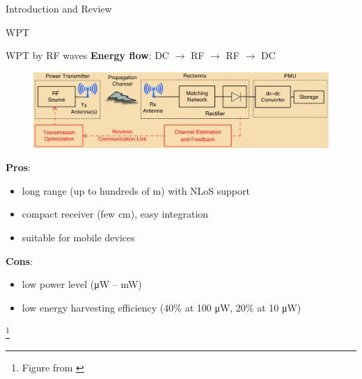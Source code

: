 \documentclass[9pt]{beamer}
\newcommand\blfootnote[1]{%
\begingroup
\renewcommand\thefootnote{}\footnote{#1}%
\addtocounter{footnote}{-1}%
\endgroup
}
\begin{document}
\begin{section}{Introduction and Review}
\begin{subsection}{WPT}
		\begin{frame}{WPT by RF waves}
			\textbf{Energy flow}: DC $\to$ \alert{RF $\to$ RF $\to$ DC}
			\begin{figure}
				\centering
				\includegraphics[width=\textwidth]{assets/wpt.eps}
			\end{figure}
			\textbf{Pros}:
			\begin{itemize}
				\item long range (up to hundreds of \si{\m}) with NLoS support
				\item compact receiver (few \si{\cm}), easy integration
				\item suitable for mobile devices
			\end{itemize}
			\textbf{Cons}:
			\begin{itemize}
				\item low power level (\si{\uW} -- \si{\mW})
				\item low energy harvesting efficiency (40\% at 100 \si{\uW}, 20\% at 10 \si{\uW})
			\end{itemize}
			\blfootnote{Figure from \cite{Clerckx2018a}}
		\end{frame}
	\end{subsection}


\end{section}
\end{document}
